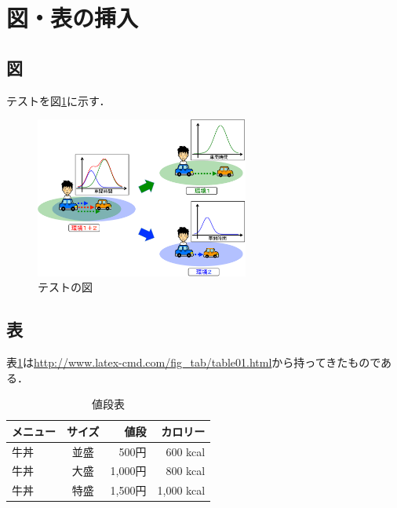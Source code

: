 \section{図・表の挿入}
\subsection{図}
テストを図\ref{fig:test}に示す．
\begin{figure}[htb]
  \begin{center}
    \includegraphics[width=7.0cm]{./images/test.pdf}
    \caption{テストの図}
    \label{fig:test}
  \end{center}
\end{figure}

\subsection{表}
表\ref{tab:price}は\url{http://www.latex-cmd.com/fig_tab/table01.html}から持ってきたものである．
\begin{table}[htb]
  \begin{center}
    \caption{値段表}
    \begin{tabular}{|l|c|r||r|} \hline
      メニュー & サイズ & 値段 & カロリー \\ \hline \hline
      牛丼 & 並盛 & 500円 & 600 kcal \\
      牛丼 & 大盛 & 1,000円 & 800 kcal \\
      牛丼 & 特盛 & 1,500円 & 1,000 kcal \\ \hline
    \end{tabular}
    \label{tab:price}
  \end{center}
\end{table}
